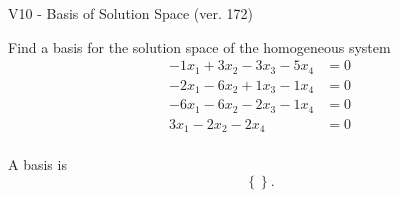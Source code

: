 \begin{exercise}
  \begin{exerciseTitle}V10 - Basis of Solution Space (ver. 172)\end{exerciseTitle}
  \begin{exerciseStatement}
    Find a basis for the solution space of the homogeneous system 
\begin{align*}
 -1 x_ 1 + 3 x_ 2 -3 x_ 3 -5 x_ 4 &= 0  \\ 
  -2 x_ 1 -6 x_ 2 + 1 x_ 3 -1 x_ 4 &= 0  \\ 
  -6 x_ 1 -6 x_ 2 -2 x_ 3 -1 x_ 4 &= 0  \\ 
  3 x_ 1 -2 x_ 2 -2 x_ 4 &= 0  \\ 
 \end{align*}


 
  \end{exerciseStatement}

  \begin{exerciseAnswer}
   A basis is   
\[\left\{\right\}.\]

  


  \end{exerciseAnswer}
\end{exercise}